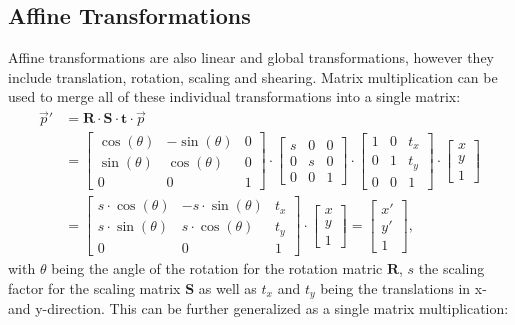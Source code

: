 \documentclass[english,version-2022-01]{uzl-thesis} %
\begin{document}
\subsection{Affine Transformations}
Affine transformations are also linear and global transformations, however they include translation, rotation, scaling and shearing. Matrix multiplication can be used to merge all of these individual transformations into a single matrix:
\begin{align}
	\overrightarrow{p}' 	&= \mathbf{R} \cdot \mathbf{S} \cdot \mathbf{t} \cdot  \overrightarrow{p}	\\
	&= 
	\begin{bmatrix}
		\cos(\theta) & -\sin(\theta) & 0\\
		\sin(\theta) & \cos(\theta) & 0\\
		0 & 0 & 1
	\end{bmatrix}
	\cdot 
	\begin{bmatrix}
		s & 0 & 0\\
		0 & s & 0\\
		0 & 0 & 1
	\end{bmatrix}
	\cdot 
	\begin{bmatrix}
		1 & 0 & t_x\\
		0 & 1 & t_y\\
		0 & 0 & 1
	\end{bmatrix}
	\cdot
	\begin{bmatrix}
		x\\
		y\\
		1
	\end{bmatrix}
	\\
	&=
	\begin{bmatrix}
		s \cdot \cos(\theta) & -s \cdot \sin(\theta) & t_x\\
		s \cdot \sin(\theta) & s \cdot \cos(\theta) & t_y\\
		0 & 0 & 1
	\end{bmatrix}
	\cdot
	\begin{bmatrix}
		x\\
		y\\
		1
	\end{bmatrix} =
	\begin{bmatrix}
		x'\\
		y'\\
		1
	\end{bmatrix} ,
\end{align}
with $\theta$ being the angle of the rotation for the rotation matric $\mathbf{R}$, $s$ the scaling factor for the scaling matrix $\mathbf{S}$ as well as $t_x$ and $t_y$ being the translations in x- and y-direction. This can be further generalized as a single matrix multiplication:
\end{document}
